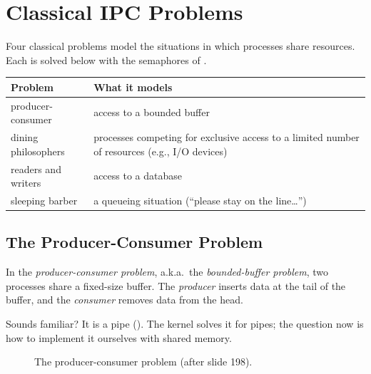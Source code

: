 \section{Classical IPC Problems}
\label{sec:classic}

Four classical problems model the situations in which processes share resources. Each is solved below with the semaphores of .
\begin{center}
\begin{tabular}{lp{}}
  \toprule
  Problem & What it models \\
  \midrule
  producer-consumer & access to a bounded buffer \\
  dining philosophers & processes competing for exclusive access to a limited number of resources (e.g., I/O devices) \\
  readers and writers & access to a database \\
  sleeping barber & a queueing situation (``please stay on the line\dots'') \\
  \bottomrule
\end{tabular}
\end{center}

\subsection{The Producer-Consumer Problem}

\begin{definition}
  In the \emph{producer-consumer problem}, a.k.a.\ the \emph{bounded-buffer problem}, two processes share a fixed-size buffer. The \emph{producer} inserts data at the tail of the buffer, and the \emph{consumer} removes data from the head.
\end{definition}

Sounds familiar? It is a pipe (). The kernel solves it for pipes; the question now is how to implement it ourselves with shared memory.

\begin{figure}[htbp]
\centering
{}
\caption{The producer-consumer problem (after slide 198).}
\label{fig:pcbuf}
\end{figure}

